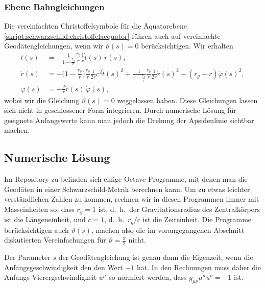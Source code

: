 \subsubsection{Ebene Bahngleichungen}
Die vereinfachten Christoffelsymbole für die Äquatorebene
\eqref{skript:schwarzschild:christoffelaequator}
führen auch auf vereinfachte Geodätengleichungen, wenn wir $\dot\vartheta(s)=0$
berücksichtigen.
Wir erhalten
\begin{align*}
\ddot t(s)
&=
-\frac{1}{1-\displaystyle\frac{r_g}{r}}\frac{r_g}{r}\frac{1}{r}\dot t(s)\,\dot r(s),
\\
\ddot r(s)
&=
-\biggl(1-\frac{r_g}{r}\biggr)\frac{r_g}{r}\frac1{2r}c^2\dot t(s)^2
+\frac{1}{1-\displaystyle\frac{r_g}{r}} \frac{r_g}{r}\frac1{2r}\dot r(s)^2
- (r_g-r) \dot\varphi(s)^2,
\\
\ddot \varphi(s)
&=
-\frac2r \dot r(s)\,\dot\varphi(s),
\end{align*}
wobei wir die Gleichung $\ddot\vartheta(s) = 0$ weggelassen haben.
Diese Gleichungen lassen sich nicht in geschlossener Form integrieren.
Durch numerische Lösung für geeignete Anfangswerte kann man jedoch die
Drehung der Apsidenlinie sichtbar machen.

\subsection{Numerische Lösung}
Im Repository zu befinden sich einige Octave-Programme, mit denen man
die Geodäten in einer Schwarzschild-Metrik berechnen kann.
Um zu etwas leichter verständlichen Zahlen zu kommen, rechnen wir
in diesen Programmen immer mit Masseinheiten so, dass $r_g=1$ ist,
d.~h.~der Gravitationsradius des Zentralkörpers ist die Längeneinheit,
und $c=1$, d.~h.~$r_g/c$ ist die Zeiteinheit.
Die Programme berücksichtigen auch $\vartheta(s)$, machen also die 
im vorangegangenen Abschnitt diskutierten Vereinfachungen für
$\vartheta=\frac{\pi}2$ nicht.

Der Parameter $s$ der Geodätengleichung ist genau dann die Eigenzeit,
wenn die Anfangsgeschwindigkeit den den Wert $-1$ hat.
In den Rechnungen muss daher die Anfangs-Vierergschwindigkeit $u^\mu$
so normiert werden, dass $g_{\mu\nu}u^\mu u^\nu=-1$ ist.

